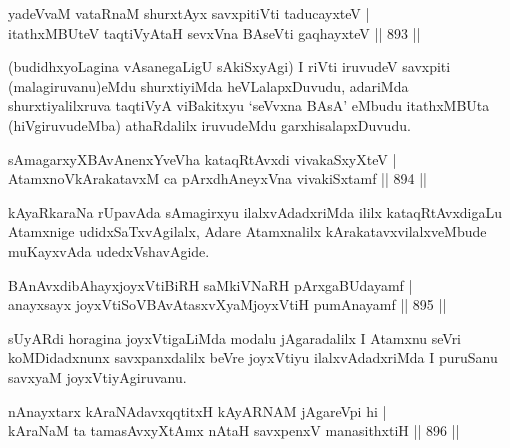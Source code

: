 
\begin{shl}
yadeVvaM vataRnaM shurxtAyx savxpitiVti taducayxteV | \\
itathxMBUteV taqtiVyA\s taH sevxVna BAseVti gaqhayxteV \hfill||  893 ||  
\end{shl}

\begin{artha}
(budidhxyoLagina vAsanegaLigU sAkiSxyAgi) I riVti iruvudeV savxpiti (malagiruvanu)eMdu shurxtiyiMda heVLalapxDuvudu, adariMda shurxtiyalilxruva taqtiVyA viBakitxyu `seVvxna BAsA' eMbudu itathxMBUta (hiVgiruvudeMba) athaRdalilx iruvudeMdu garxhisalapxDuvudu.
\end{artha}


\begin{shl}
sAmagarxyXBAvAnenxYveVha kataqRtAvxdi vivakaSxyXteV | \\
AtamxnoV\s kArakatavxM ca pArxdhAneyxVna vivakiSxtamf \hfill||  894 ||  
\end{shl}

\begin{artha}
kAyaRkaraNa rUpavAda sAmagirxyu ilalxvAdadxriMda ililx kataqRtAvxdigaLu Atamxnige udidxSaTxvAgilalx, Adare Atamxnalilx kArakatavxvilalxveMbude muKayxvAda udedxVshavAgide.
\end{artha}


\begin{shl}
BAnAvxdibAhayxjoyxVtiBiRH saMkiVNaRH pArxgaBUdayamf | \\
anayxsayx joyxVtiSoV\s BAvAtasxvXyaMjoyxVtiH pumAnayamf \hfill||  895 ||  
\end{shl}

\begin{artha}
sUyARdi horagina joyxVtigaLiMda modalu jAgaradalilx I Atamxnu seVri koMDidadxnunx savxpanxdalilx beVre joyxVtiyu ilalxvAdadxriMda I puruSanu savxyaM joyxVtiyAgiruvanu.
\end{artha}


\begin{shl}
nAnayxtarx kAraNAdavxqqtitxH kAyARNAM jAgareV\s pi hi | \\
kAraNaM ta tamasAvxyXtAmx nAtaH savxpenxV manasithxtiH \hfill||  896 ||  
\end{shl}

